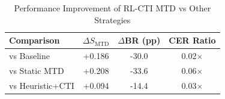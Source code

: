 \begin{table}[!t]
\centering
\caption{Performance Improvement of RL-CTI MTD vs Other Strategies}
\label{tab:improvement}
\renewcommand{\arraystretch}{1.1}
\begin{tabular}{@{}lccc@{}}
\toprule
\textbf{Comparison} & $\Delta S_{\mathrm{MTD}}$ & $\Delta$\textbf{BR (pp)} & \textbf{CER Ratio} \\
\midrule
vs Baseline & +0.186 & -30.0 & 0.02$\times$ \\
vs Static MTD & +0.208 & -33.6 & 0.06$\times$ \\
vs Heuristic+CTI & +0.094 & -14.4 & 0.03$\times$ \\
\bottomrule
\end{tabular}
\end{table}
